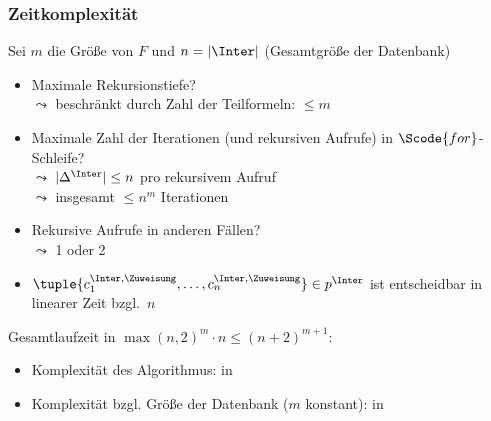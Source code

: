 \documentclass[aspectratio=1610,onlymath]{beamer}
\begin{document}
\begin{frame}\frametitle{Zeitkomplexität}

Sei $m$ die Größe von $F$ und $n=|\Inter|$ (Gesamtgröße der Datenbank)
\bigskip

\begin{itemize}
\item Maximale Rekursionstiefe?\\\pause
$\leadsto$ beschränkt durch Zahl der Teilformeln: $\leq m$
%
\item Maximale Zahl der Iterationen (und rekursiven Aufrufe) in $\Scode{for}$-Schleife?\\\pause
$\leadsto$ $|\Delta^\Inter|\leq n$ pro rekursivem Aufruf\\
$\leadsto$ insgesamt $\leq n^m$ Iterationen\pause
%
\item Rekursive Aufrufe in anderen Fällen?\\
$\leadsto$ 1 oder 2 \pause
%
\item $\tuple{c_1^{\Inter,\Zuweisung},\ldots,c_n^{\Inter,\Zuweisung}}\in p^\Inter$ ist entscheidbar in linearer Zeit bzgl.\ $n$
\end{itemize}
\bigskip\pause

Gesamtlaufzeit in $\max(n,2)^m\cdot n \leq (n+2)^{m+1}$:
\begin{itemize}
\item Komplexität des Algorithmus: \alert{in \ExpTime}
\item Komplexität bzgl. Größe der Datenbank ($m$ konstant): \alert{in \PTime}
\end{itemize}

\end{frame}
\end{document}
